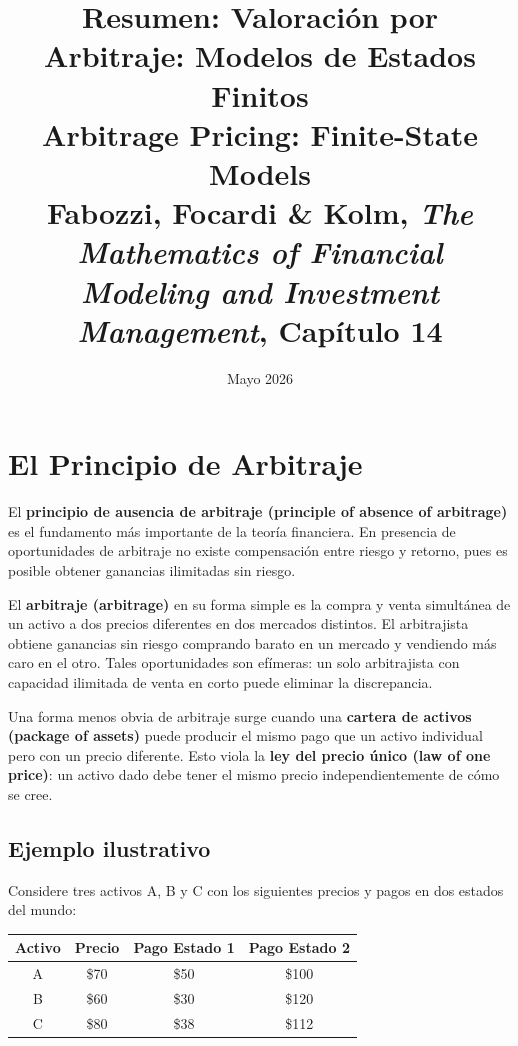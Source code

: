 \documentclass[12pt]{article}
\title{\textbf{Resumen: Valoraci\'on por Arbitraje: Modelos de Estados Finitos}\\
\large Arbitrage Pricing: Finite-State Models\\
\normalsize Fabozzi, Focardi \& Kolm, \textit{The Mathematics of Financial Modeling and Investment Management}, Cap\'itulo 14}
\author{}
\date{Mayo 2026}
\begin{document}
\maketitle
\tableofcontents
\newpage

\section{El Principio de Arbitraje}

El \textbf{principio de ausencia de arbitraje (principle of absence of arbitrage)} es el fundamento m\'as importante de la teor\'ia financiera. En presencia de oportunidades de arbitraje no existe compensaci\'on entre riesgo y retorno, pues es posible obtener ganancias ilimitadas sin riesgo.

El \textbf{arbitraje (arbitrage)} en su forma simple es la compra y venta simult\'anea de un activo a dos precios diferentes en dos mercados distintos. El arbitrajista obtiene ganancias sin riesgo comprando barato en un mercado y vendiendo m\'as caro en el otro. Tales oportunidades son ef\'imeras: un solo arbitrajista con capacidad ilimitada de venta en corto puede eliminar la discrepancia.

Una forma menos obvia de arbitraje surge cuando una \textbf{cartera de activos (package of assets)} puede producir el mismo pago que un activo individual pero con un precio diferente. Esto viola la \textbf{ley del precio \'unico (law of one price)}: un activo dado debe tener el mismo precio independientemente de c\'omo se cree.

\subsection{Ejemplo ilustrativo}

Considere tres activos A, B y C con los siguientes precios y pagos en dos estados del mundo:

\begin{center}
\begin{tabular}{cccc}
\toprule
Activo & Precio & Pago Estado 1 & Pago Estado 2 \\
\midrule
A & \$70 & \$50 & \$100 \\
B & \$60 & \$30 & \$120 \\
C & \$80 & \$38 & \$112 \\
\bottomrule
\end{tabular}
\end{center}
\end{document}
